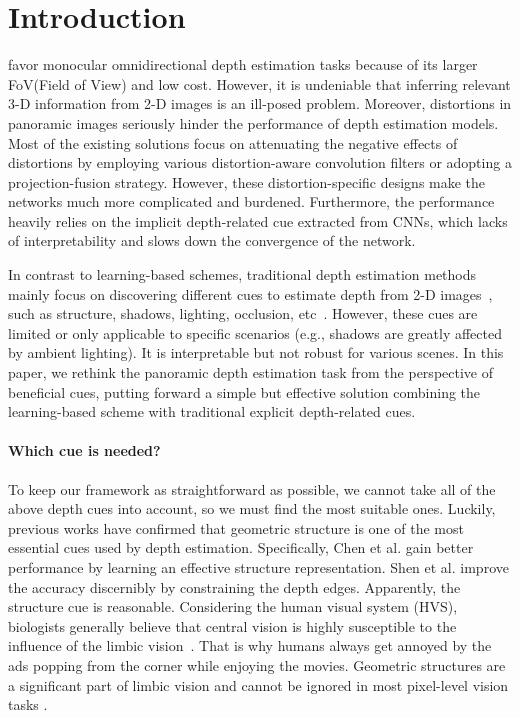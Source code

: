 \documentclass[10pt,times,mathptm,psfig,twocolumn,journals]{IEEEtran}
\begin{document}
\section{Introduction}
\label{section1}
 favor monocular omnidirectional depth estimation tasks because of its larger FoV(Field of View) and low cost. However, it is undeniable that inferring relevant 3-D information from 2-D images is an ill-posed problem. Moreover, distortions in panoramic images seriously hinder the performance of depth estimation models. Most of the existing solutions focus on attenuating the negative effects of distortions by employing various distortion-aware convolution filters or adopting a projection-fusion strategy. However, these distortion-specific designs make the networks much more complicated and burdened. Furthermore, the performance heavily relies on the implicit depth-related cue extracted from CNNs, which lacks of interpretability and slows down the convergence of the network.

In contrast to learning-based schemes, traditional depth estimation methods mainly focus on discovering different cues to estimate depth from 2-D images~\cite{8353313,9615228,8764412,8105853}, such as structure, shadows, lighting, occlusion, etc~\cite{dijk2019neural}. However, these cues are limited or only applicable to specific scenarios (e.g., shadows are greatly affected by ambient lighting). It is interpretable but not robust for various scenes. In this paper, we rethink the panoramic depth estimation task from the perspective of beneficial cues, putting forward a simple but effective solution combining the learning-based scheme with traditional explicit depth-related cues. 


\paragraph{Which cue is needed?}
To keep our framework as straightforward as possible, we cannot take all of the above depth cues into account, so we must find the most suitable ones. Luckily, previous works have confirmed that geometric structure is one of the most essential cues used by depth estimation. Specifically, Chen et al.\cite{Chen_2021_CVPR} gain better performance by learning an effective structure representation. Shen et al.\cite{shen2021distortion,Pintore_2021_CVPR} improve the accuracy discernibly by constraining the depth edges. Apparently, the structure cue is reasonable. Considering the human visual system (HVS), biologists generally believe that central vision is highly susceptible to the influence of the limbic vision~\cite{sivak1990integration}. That is why humans always get annoyed by the ads popping from the corner while enjoying the movies. Geometric structures are a significant part of limbic vision and cannot be ignored in most pixel-level vision tasks \cite{8307430}.
  
\end{document}
